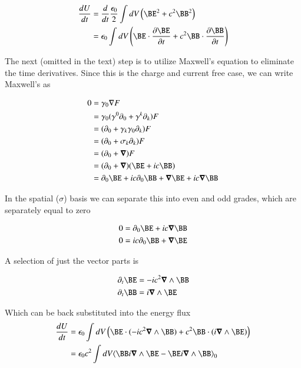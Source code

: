\begin{align*}
\frac{dU}{dt} 
&= 
\frac{d}{dt} 
\frac{\epsilon_0}{2} \int dV \left( \BE^2 + c^2 \BB^2 \right) \\
&= 
\epsilon_0 \int dV \left( \BE \cdot \PD{t}{\BE} + c^2 \BB \cdot \PD{t}{\BB} \right) \\
\end{align*}

The next (omitted in the text) step is to utilize Maxwell's equation to eliminate the time derivatives.  Since this is the
charge and current free case, we can write Maxwell's as

\begin{align*}
0
&= \gamma_0 \grad F \\
&= \gamma_0 (\gamma^0 \partial_0 + \gamma^k \partial_k) F \\
&= (\partial_0 + \gamma_k\gamma_0 \partial_k) F \\
&= (\partial_0 + \sigma_k \partial_k) F \\
&= (\partial_0 + \spacegrad)F \\
&= (\partial_0 + \spacegrad)(\BE + ic \BB) \\
&= \partial_0 \BE + ic \partial_0 \BB + \spacegrad \BE + ic \spacegrad \BB \\
\end{align*}

In the spatial ($\sigma$) basis we can separate this into even and odd grades, which are separately equal to zero

\begin{align*}
0 &= \partial_0 \BE + ic \spacegrad \BB \\
0 &= ic \partial_0 \BB + \spacegrad \BE 
\end{align*}

A selection of just the vector parts is

\begin{align*}
\partial_t \BE &= - ic^2 \spacegrad \wedge \BB \\
\partial_t \BB &= i\spacegrad \wedge \BE 
\end{align*}

Which can be back substituted into the energy flux
\begin{align*}
\frac{dU}{dt} 
&= \epsilon_0 \int dV \left( \BE \cdot (-i c^2 \spacegrad \wedge \BB) + c^2 \BB \cdot (i \spacegrad \wedge \BE) \right) \\
&= \epsilon_0 c^2 \int dV \gpgradezero{ \BB i \spacegrad \wedge \BE -\BE i \spacegrad \wedge \BB } \\
\end{align*}

